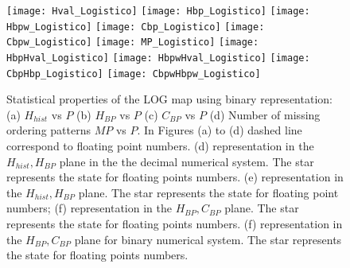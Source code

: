 \begin{figure}
	\texttt{[image: Hval\_Logistico]}
	\texttt{[image: Hbp\_Logistico]}
	\texttt{[image: Hbpw\_Logistico]}
	\texttt{[image: Cbp\_Logistico]}
	\texttt{[image: Cbpw\_Logistico]}
	\texttt{[image: MP\_Logistico]}
	\texttt{[image: HbpHval\_Logistico]}
	\texttt{[image: HbpwHval\_Logistico]}
	\texttt{[image: CbpHbp\_Logistico]}
	\texttt{[image: CbpwHbpw\_Logistico]}
	\caption{Statistical properties of the LOG map using binary representation: (a) $H_{hist}$ vs $P$ (b) $H_{BP}$ vs $P$ (c) $C_{BP}$ vs $P$ (d) Number of missing ordering patterns $MP$ vs $P$. In Figures (a) to (d) dashed line correspond to floating point numbers. (d) representation in the $H_{hist},H_{BP}$ plane in the the decimal numerical system.  The star represents the state for floating points numbers. (e) representation in the $H_{hist},H_{BP}$ plane. The star represents the state for floating point numbers; (f) representation in the $H_{BP},C_{BP}$ plane.  The star represents the state for floating points numbers. (f) representation in the $H_{BP},C_{BP}$ plane for binary numerical system.  The star represents the state for floating points numbers. } \label{fig:LOGbinario}
\end{figure}
